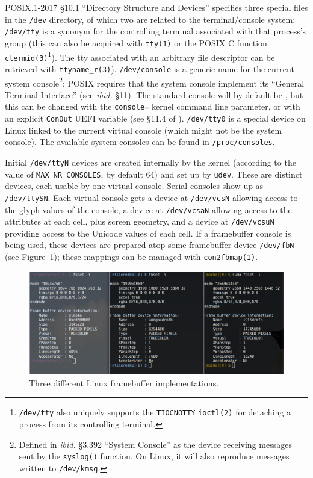 POSIX.1-2017\cite{posix2017} §10.1 ``Directory Structure and Devices''
specifies three special files in the \texttt{/dev} directory, of which two are
related to the terminal/console system: \texttt{/dev/tty} is a synonym for the
controlling terminal associated with that process's group (this can also be
acquired with \texttt{tty(1)} or the POSIX C function
\texttt{ctermid(3)}\footnote{\texttt{/dev/tty} also uniquely supports the
  \texttt{TIOCNOTTY} \texttt{ioctl(2)} for detaching a process from its
  controlling terminal.}). The tty associated with an arbitrary file descriptor
can be retrieved with \texttt{ttyname\_r(3)}). \texttt{/dev/console} is a
generic name for the current system console\footnote{Defined in \textit{ibid.}
  §3.392 ``System Console'' as the device receiving messages sent by the
  \texttt{syslog()} function. On Linux, it will also reproduce messages written
  to \texttt{/dev/kmsg}\cite{dmesg}.}; POSIX requires that the system console
implement its ``General Terminal Interface'' (see \textit{ibid.} §11). The
standard console will by default be , but this can be changed
with the \texttt{console=} kernel command line parameter, or with an explicit
\texttt{ConOut} UEFI variable (see §11.4 of \cite{uefi}). \texttt{/dev/tty0} is
a special device on Linux linked to the current virtual console (which might
not be the system console). The available system consoles can be found in
\texttt{/proc/consoles}.

Initial \texttt{/dev/ttyN} devices are created internally by the kernel
(according to the value of \texttt{MAX\_NR\_CONSOLES}, by default 64) and set
up by \texttt{udev}. These are distinct devices, each usable by one virtual
console. Serial consoles show up as \texttt{/dev/ttySN}\cite{ttys4}. Each
virtual console gets a device at \texttt{/dev/vcsN} allowing access to the
glyph values of the console, a device at \texttt{/dev/vcsaN} allowing access to
the attributes at each cell, plus screen geometry, and a device at \texttt{/dev/vcsuN}
providing access to the Unicode values of each cell\cite{vcs4}. If a framebuffer console
is being used, these devices are prepared atop some framebuffer device \texttt{/dev/fbN} (see
Figure~\ref{fig:framebuffers}); these mappings can be managed with \texttt{con2fbmap(1)}.

\begin{figure}[!htb]
  \centering
  \includegraphics[width=.75\linewidth]{media/framebuffers.png}
  \caption{Three different Linux framebuffer implementations.}
  \label{fig:framebuffers}
\end{figure}

